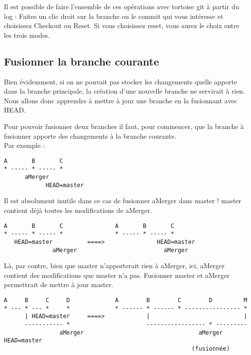 Il est possible de faire l'ensemble de ces opérations avec tortoise git à partir du log : Faites un clic droit sur la branche ou le commit qui vous intéresse et choisissez Checkout ou Reset. Si vous choisissez reset, vous aurez le choix entre les trois modes.

\newpage

\subsection{Fusionner la branche courante}

Bien évidemment, si on ne pouvait pas stocker les changements quelle apporte dans la branche principale, la création d'une nouvelle branche ne servirait à rien.
Nous allons donc apprendre à mettre à jour une branche en la fusionnant avec HEAD.

Pour pouvoir fusionner deux branches il faut, pour commencer, que la branche à fusionner apporte des changements à la branche courante.\\

Par exemple :
\begin{verbatim}
A       B       C
* ----- * ----- *
      aMerger 
            HEAD=master
\end{verbatim}

Il est absolument inutile dans ce cas de fusionner aMerger dans master !
master contient déjà toutes les modifications de aMerger.
\newpage
\begin{verbatim}
A       B       C               A       B       C
* ----- * ----- *               * ----- * ----- *
   HEAD=master          ====>               HEAD=master
              aMerger                         aMerger
\end{verbatim}

Là, par contre, bien que master n'apporterait rien à aMerger, ici,
aMerger contient des modifications que master n'a pas. Fusionner master et aMerger permettrait de mettre à jour master.

\begin{verbatim}
A     B     C     D             A        B        C        D         M
* --- * --- *     *             * ------ * ------ * ---------------- *      
      | HEAD=master     ====>            |                           |
      ----------- *                      ----------------- * ---------
                aMerger                                 aMerger  HEAD=master
                                                      (fusionnée)
\end{verbatim}


